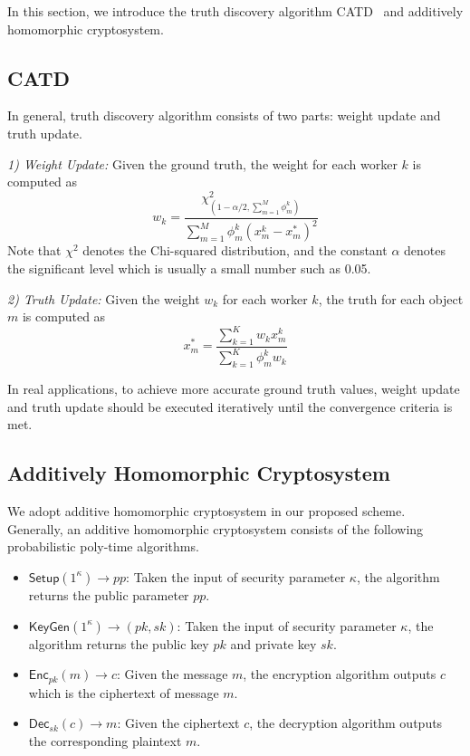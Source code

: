 \documentclass[conference]{IEEEtran}
\begin{document}
In this section, we introduce the truth discovery algorithm CATD~\cite{li_confidence-aware_2014} and additively homomorphic cryptosystem.


\subsection{CATD}

In general, truth discovery algorithm consists of two parts: weight update and truth update.

\textit{1) Weight Update:} Given the ground truth, the weight for each worker $k$ is computed as
\begin{equation}
w_k = \frac{\chi^2_{(1-\alpha/2,\sum_{m=1}^M \phi_m^k)}}{\sum_{m=1}^M \phi_m^k(x_m^k - x_m^*)^2}
\end{equation}
Note that $\chi^2$ denotes the Chi-squared distribution, and the constant $\alpha$ denotes the significant level which is usually a small number such as 0.05.

\textit{2) Truth Update:} Given the weight $w_k$ for each worker $k$, the truth for each object $m$ is computed as
\begin{equation}
x_m^* = \frac{\sum_{k=1}^K w_k x_m^k}{\sum_{k=1}^K \phi_m^k w_k }
\end{equation}

In real applications, to achieve more accurate ground truth values, weight update and truth update should be executed iteratively until the convergence criteria is met.

\subsection{Additively Homomorphic Cryptosystem}\label{sec4-b}

We adopt additive homomorphic cryptosystem in our proposed scheme.
Generally, an additive homomorphic cryptosystem consists of the following probabilistic poly-time algorithms.

\begin{itemize}
  \item $\mathsf{Setup}(1^\kappa)\to pp$: Taken the input of security parameter $\kappa$, the algorithm returns the public parameter $pp$.
  \item $\mathsf{KeyGen}(1^\kappa)\to (pk, sk)$: Taken the input of security parameter $\kappa$, the algorithm returns the public key $pk$ and private key $sk$.
  \item $\mathsf{Enc}_{pk}(m)\to c$: Given the message $m$, the encryption algorithm outputs $c$ which is the ciphertext of message $m$.
  \item $\mathsf{Dec}_{sk}(c)\to m$: Given the ciphertext $c$, the decryption algorithm outputs the corresponding plaintext $m$.
\end{itemize}
\end{document}
